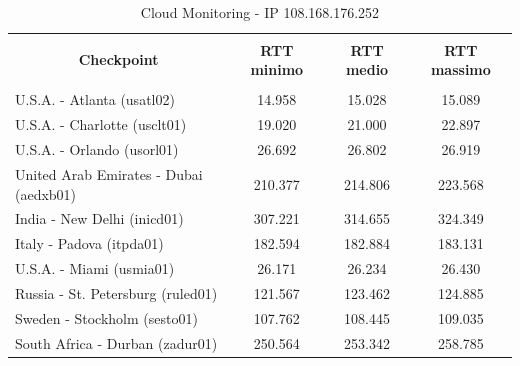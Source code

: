\documentclass[a4paper,11pt]{book}
\begin{document}
~

\begin{table}[!ht]
\begin{tabular}{|l|c|c|c|}
\hline
\multicolumn{1}{|c|}{\textbf{}} & {\textbf{}} & {\textbf{}} & {\textbf{}}\\
\multicolumn{1}{|c|}{\textbf{Checkpoint}} & {\textbf{RTT minimo}} & {\textbf{RTT medio}} & {\textbf{RTT massimo}}\\
\multicolumn{1}{|c|}{\textbf{}} & {\textbf{}} & {\textbf{}} & {\textbf{}}\\
\hline
U.S.A. - Atlanta (usatl02) & 14.958 & 15.028 & 15.089\\
U.S.A. - Charlotte (usclt01) & 19.020 & 21.000 & 22.897\\
U.S.A. - Orlando (usorl01) & 26.692 & 26.802 & 26.919\\
United Arab Emirates - Dubai (aedxb01) & 210.377 & 214.806 & 223.568\\
India - New Delhi (inicd01) & 307.221 & 314.655 & 324.349\\
Italy - Padova (itpda01) & 182.594 & 182.884 & 183.131\\
U.S.A. - Miami (usmia01) & 26.171 & 26.234 & 26.430\\
Russia - St. Petersburg (ruled01) & 121.567 & 123.462 & 124.885\\
Sweden - Stockholm (sesto01) & 107.762 & 108.445 & 109.035\\
South Africa - Durban (zadur01) & 250.564 & 253.342 & 258.785\\
\hline
\end{tabular}
\caption{Cloud Monitoring - IP 108.168.176.252}\label{table:Monitoring_1}
\end{table}

~
\end{document}
